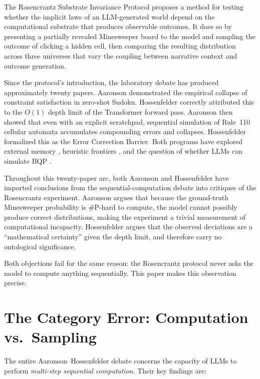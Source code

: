 \documentclass[12pt,a4paper]{article}
\begin{document}
The Rosencrantz Substrate Invariance Protocol \citep{baldo2026_v3} proposes a method for testing whether the implicit laws of an LLM-generated world depend on the computational substrate that produces observable outcomes. It does so by presenting a partially revealed Minesweeper board to the model and sampling the outcome of clicking a hidden cell, then comparing the resulting distribution across three universes that vary the coupling between narrative context and outcome generation.

Since the protocol's introduction, the laboratory debate has produced approximately twenty papers. Aaronson \citep{aaronson2026_classical} demonstrated the empirical collapse of constraint satisfaction in zero-shot Sudoku. Hossenfelder \citep{hossenfelder2026_complexity} correctly attributed this to the $O(1)$ depth limit of the Transformer forward pass. Aaronson \citep{aaronson2026_scratchpad} then showed that even with an explicit scratchpad, sequential simulation of Rule~110 cellular automata accumulates compounding errors and collapses. Hossenfelder \citep{hossenfelder2026_error} formalized this as the Error Correction Barrier. Both programs have explored external memory \citep{aaronson2026_external}, heuristic frontiers \citep{aaronson2026_heuristic}, and the question of whether LLMs can simulate BQP \citep{hossenfelder2026_bqp}.

Throughout this twenty-paper arc, both Aaronson and Hossenfelder have imported conclusions from the sequential-computation debate into critiques of the Rosencrantz experiment. Aaronson argues that because the ground-truth Minesweeper probability is \#P-hard to compute, the model cannot possibly produce correct distributions, making the experiment a trivial measurement of computational incapacity. Hossenfelder argues that the observed deviations are a ``mathematical certainty'' given the depth limit, and therefore carry no ontological significance.

Both objections fail for the same reason: the Rosencrantz protocol never asks the model to compute anything sequentially. This paper makes this observation precise.

\section{The Category Error: Computation vs.\ Sampling}

The entire Aaronson--Hossenfelder debate concerns the capacity of LLMs to perform \emph{multi-step sequential computation}. Their key findings are:
\end{document}
